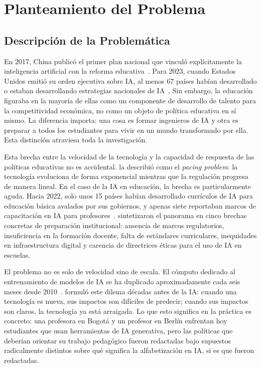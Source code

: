 \chapter{Planteamiento del Problema}
\label{cap:planteamiento}


\section{Descripción de la Problemática}
\label{sec:problematica}

En 2017, China publicó el primer plan nacional que vinculó explícitamente la inteligencia artificial con la reforma educativa~\citep{china2017ai}. Para 2023, cuando Estados Unidos emitió su orden ejecutiva sobre IA, al menos 67 países habían desarrollado o estaban desarrollando estrategias nacionales de IA~\citep{unesco2023genai}. Sin embargo, la educación figuraba en la mayoría de ellas como un componente de desarrollo de talento para la competitividad económica, no como un objeto de política educativa en sí mismo. La diferencia importa: una cosa es formar ingenieros de IA y otra es preparar a todos los estudiantes para vivir en un mundo transformado por ella. Esta distinción atraviesa toda la investigación.

Esta brecha entre la velocidad de la tecnología y la capacidad de respuesta de las políticas educativas no es accidental. \citet{thierer2018pacing} la describió como el \textit{pacing problem}: la tecnología evoluciona de forma exponencial mientras que la regulación progresa de manera lineal. En el caso de la IA en educación, la brecha es particularmente aguda. Hacia 2022, solo unos 15 países habían desarrollado currículos de IA para educación básica avalados por sus gobiernos, y apenas siete reportaban marcos de capacitación en IA para profesores~\citep{unesco2023genai}. \citet{miao2021guidance} sintetizaron el panorama en cinco brechas concretas de preparación institucional: ausencia de marcos regulatorios, insuficiencia en la formación docente, falta de estándares curriculares, inequidades en infraestructura digital y carencia de directrices éticas para el uso de IA en escuelas.

El problema no es solo de velocidad sino de escala. El cómputo dedicado al entrenamiento de modelos de IA se ha duplicado aproximadamente cada seis meses desde 2010~\citep{sevilla2022compute}. \citet{collingridge1980social} formuló este dilema décadas antes de la IA: cuando una tecnología es nueva, sus impactos son difíciles de predecir; cuando sus impactos son claros, la tecnología ya está arraigada. Lo que esto significa en la práctica es concreto: una profesora en Bogotá y un profesor en Berlín enfrentan hoy estudiantes que usan herramientas de IA generativa, pero las políticas que deberían orientar su trabajo pedagógico fueron redactadas bajo supuestos radicalmente distintos sobre qué significa la alfabetización en IA, si es que fueron redactadas.


